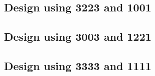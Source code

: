 
 \begin{center}




 \end{center}



\subsection{Design using 3223 and 1001}


 \begin{center}




 \end{center}



\subsection{Design using 3003 and 1221}


 \begin{center}




 \end{center}



\subsection{Design using 3333 and 1111}


